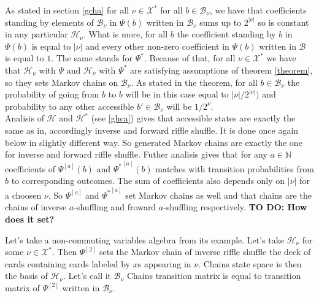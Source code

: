 \documentclass[a4paper, 12pt]{article}
\newcommand{\todo}[1]{\hfill \break \textbf{\Huge TO DO: #1 \hfill \break}\normalsize}
\begin{document}
As stated in section \ref{gcha} for all $\nu \in \mathcal{X}^*$ for all $b \in \mathcal{B}_\nu$,
we have that coefficients standing by elements of $\mathcal{B}_\nu$
in $\Psi(b)$ written in $\mathcal{B}_\nu$ sums up to $2^{|\nu|}$ so is constant in any particular
$\mathcal{H}_\nu$. What is more, for all $b$ the coefficient standing by $b$ in $\Psi(b)$ is equal to
$|\nu|$ and every other non-zero coefficient in $\Psi(b)$ written in $\mathcal{B}$ is equal to $1$.
The same stands for $\Psi^*$. Because of that, for all $\nu \in \mathcal{X}^*$ we have that
$\mathcal{H}_\nu$ with $\Psi$ and $\mathcal{H}_\nu$ with $\Psi^*$ are satisfying assumptions of
theorem \ref{theorem}, so they sets Markov chains on $\mathcal{B}_\nu$. As stated in the theorem,
for all $b \in \mathcal{B}_\nu$ the probability of going from $b$ to $b$ will be in this case equal to
$|\nu|/2^{|\nu|})$ and probability to any other accessible $b' \in \mathcal{B}_\nu$ will be $1/2^\nu$. \\
Analisis of $\mathcal{H}$ and $\mathcal{H}^*$ (see \ref{ghca}) gives that accessible states are exactly
the same as in, accordingly inverse and forward riffle shuffle. It is done once again below in slightly
different way. So generated Markov chains are exactly the one for inverse and forward riffle shuffle.
Futher analisis gives that for any $a \in \mathbb{N}$ coefficients of $\Psi^{[a]}(b)$ and ${\Psi^*}^{[a]}(b)$
matches with transition probabilities from $b$ to corresponding outcomes. The sum of coefficients also
depends only on $|\nu|$ for a choosen $\nu$. So $\Psi^{[a]}$ and ${\Psi^*}^{[a]}$ set Markov chains as well
and that chains are the chains of inverse $a$-shuffling and froward $a$-shuffling respectively.
\todo{How does it set?}

Let's take a non-commuting variables algebra from its example. Let's take $\mathcal{H}_\nu$ for some
$\nu \in \mathcal{X}^*$. Then $\Psi^{[2]}$ sets the Markov chain of inverse riffle shuffle the deck of cards
containing cards labeled by $x$s appearing in $\nu$. Chains state space is then the basis of
$\mathcal{H}_\nu$. Let's call it $\mathcal{B}_\nu$
Chains transition matrix is equal to transition matrix of $\Psi^{[2]}$ written in $\mathcal{B}_\nu$.  \\
\end{document}
